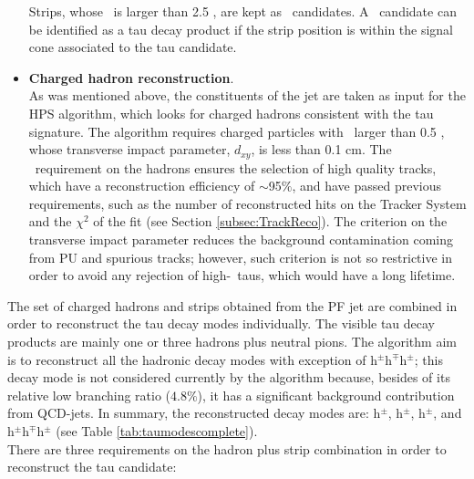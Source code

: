 \begin{itemize}
\noindent Strips, whose \pt~is larger than 2.5 \GeV, are kept as \picero~candidates. A 
\picero~candidate can be identified as a tau decay product if the strip position 
is within the signal cone associated to the tau candidate.
 
 \item \textbf{Charged hadron reconstruction}. \\

\noindent As was mentioned above, the constituents of the jet are taken as input for the HPS algorithm,
which looks for charged hadrons consistent with the tau signature. The algorithm
requires charged particles with \pt~larger than 0.5 \GeV, whose transverse impact 
parameter, $d_{xy}$, is less than 0.1 cm. The \pt~requirement on the hadrons ensures 
the selection of high quality tracks, which have a reconstruction efficiency 
of $\sim$95$\%$, and have passed previous requirements, such as the number of reconstructed 
hits on the Tracker System and the $\chi^{2}$ of the fit 
(see Section \ref{subsec:TrackReco}). The criterion on the transverse impact
parameter reduces the background contamination coming from PU and spurious tracks; however, such 
criterion is not so restrictive in order to avoid any rejection of high-\pt~taus, which
would have a long lifetime. 
\end{itemize}

\noindent The set of charged hadrons and strips obtained from the PF jet are 
combined in order to reconstruct the tau decay modes individually. The visible tau decay
products are mainly one or three hadrons plus neutral pions. The 
algorithm aim is to reconstruct all the hadronic decay modes with 
exception of h$^{\pm}$h$^{\mp}$h$^{\pm}$\picero; this decay mode 
is not considered currently by the algorithm because, besides of its
relative low branching ratio ($4.8\%$), it has a significant
background contribution from QCD-jets. In summary, the reconstructed 
decay modes are: h$^{\pm}$, h$^{\pm}$\picero, h$^{\pm}$\picero\picero, 
and h$^{\pm}$h$^{\mp}$h$^{\pm}$ (see Table \ref{tab:taumodescomplete}). \\

\noindent There are three requirements on the hadron plus strip combination
in order to reconstruct the tau candidate: 

